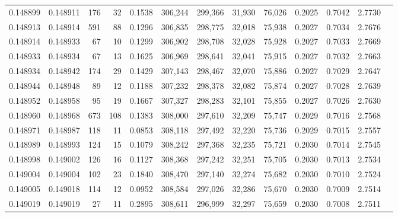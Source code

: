 \begin{tabular}{rrrrrrrrrrrrr}
0.148899 & 0.148911 &   176 &  32 &                                     0.1538 & 306,244 & 299,366 &  31,930 &  76,026 & 0.2025 & 0.7042 & 2.7730 \\
0.148913 & 0.148914 &   591 &  88 &                                     0.1296 & 306,835 & 298,775 &  32,018 &  75,938 & 0.2027 & 0.7034 & 2.7676 \\
0.148914 & 0.148933 &    67 &  10 &                                     0.1299 & 306,902 & 298,708 &  32,028 &  75,928 & 0.2027 & 0.7033 & 2.7669 \\
0.148933 & 0.148934 &    67 &  13 &                                     0.1625 & 306,969 & 298,641 &  32,041 &  75,915 & 0.2027 & 0.7032 & 2.7663 \\
0.148934 & 0.148942 &   174 &  29 &                                     0.1429 & 307,143 & 298,467 &  32,070 &  75,886 & 0.2027 & 0.7029 & 2.7647 \\
0.148944 & 0.148948 &    89 &  12 &                                     0.1188 & 307,232 & 298,378 &  32,082 &  75,874 & 0.2027 & 0.7028 & 2.7639 \\
0.148952 & 0.148958 &    95 &  19 &                                     0.1667 & 307,327 & 298,283 &  32,101 &  75,855 & 0.2027 & 0.7026 & 2.7630 \\
0.148960 & 0.148968 &   673 & 108 &                                     0.1383 & 308,000 & 297,610 &  32,209 &  75,747 & 0.2029 & 0.7016 & 2.7568 \\
0.148971 & 0.148987 &   118 &  11 &                                     0.0853 & 308,118 & 297,492 &  32,220 &  75,736 & 0.2029 & 0.7015 & 2.7557 \\
0.148989 & 0.148993 &   124 &  15 &                                     0.1079 & 308,242 & 297,368 &  32,235 &  75,721 & 0.2030 & 0.7014 & 2.7545 \\
0.148998 & 0.149002 &   126 &  16 &                                     0.1127 & 308,368 & 297,242 &  32,251 &  75,705 & 0.2030 & 0.7013 & 2.7534 \\
0.149004 & 0.149004 &   102 &  23 &                                     0.1840 & 308,470 & 297,140 &  32,274 &  75,682 & 0.2030 & 0.7010 & 2.7524 \\
0.149005 & 0.149018 &   114 &  12 &                                     0.0952 & 308,584 & 297,026 &  32,286 &  75,670 & 0.2030 & 0.7009 & 2.7514 \\
0.149019 & 0.149019 &    27 &  11 &                                     0.2895 & 308,611 & 296,999 &  32,297 &  75,659 & 0.2030 & 0.7008 & 2.7511 \\

\end{tabular}
